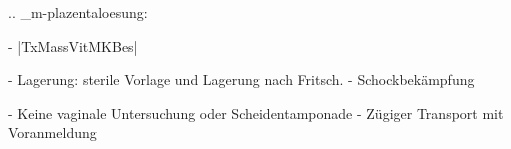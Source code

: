 
.. _m-plazentaloesung:


\begin{itemize}
  -   |TxMassVitMKBes|
  \begin{itemize}
    -   Lagerung: sterile Vorlage und Lagerung nach Fritsch.
    -   Schockbekämpfung
  \end{itemize}
  -   Keine vaginale Untersuchung oder  Scheidentamponade
  -   Zügiger Transport mit Voranmeldung
\end{itemize}